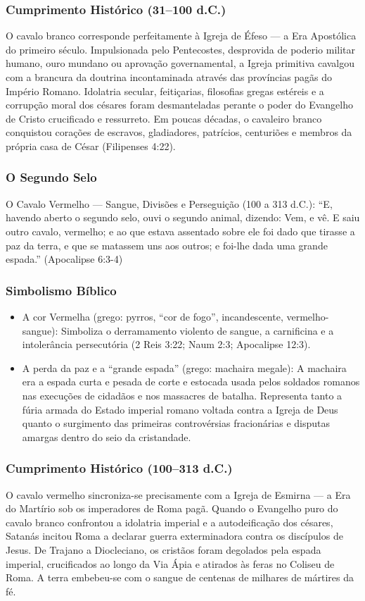 \documentclass[11pt,a4paper,openany]{book}
\begin{document}
\subsubsection*{Cumprimento Histórico (31–100 d.C.)}
O cavalo branco corresponde perfeitamente à Igreja de Éfeso — a Era Apostólica do primeiro século. Impulsionada pelo Pentecostes, desprovida de poderio militar humano, ouro mundano ou aprovação governamental, a Igreja primitiva cavalgou com a brancura da doutrina incontaminada através das províncias pagãs do Império Romano. Idolatria secular, feitiçarias, filosofias gregas estéreis e a corrupção moral dos césares foram desmanteladas perante o poder do Evangelho de Cristo crucificado e ressurreto. Em poucas décadas, o cavaleiro branco conquistou corações de escravos, gladiadores, patrícios, centuriões e membros da própria casa de César (Filipenses 4:22).


\subsubsection*{O Segundo Selo}
O Cavalo Vermelho — Sangue, Divisões e Perseguição (100 a 313 d.C.):
``E, havendo aberto o segundo selo, ouvi o segundo animal, dizendo: Vem, e vê. E saiu outro cavalo, vermelho; e ao que estava assentado sobre ele foi dado que tirasse a paz da terra, e que se matassem uns aos outros; e foi-lhe dada uma grande espada.'' (Apocalipse 6:3-4)


\subsubsection*{Simbolismo Bíblico}
\begin{itemize}
  \item A cor Vermelha (grego: pyrros, ``cor de fogo'', incandescente, vermelho-sangue): Simboliza o derramamento violento de sangue, a carnificina e a intolerância persecutória (2 Reis 3:22; Naum 2:3; Apocalipse 12:3).
  \item A perda da paz e a ``grande espada'' (grego: machaira megale): A machaira era a espada curta e pesada de corte e estocada usada pelos soldados romanos nas execuções de cidadãos e nos massacres de batalha. Representa tanto a fúria armada do Estado imperial romano voltada contra a Igreja de Deus quanto o surgimento das primeiras controvérsias fracionárias e disputas amargas dentro do seio da cristandade.
\end{itemize}



\subsubsection*{Cumprimento Histórico (100–313 d.C.)}
O cavalo vermelho sincroniza-se precisamente com a Igreja de Esmirna — a Era do Martírio sob os imperadores de Roma pagã. Quando o Evangelho puro do cavalo branco confrontou a idolatria imperial e a autodeificação dos césares, Satanás incitou Roma a declarar guerra exterminadora contra os discípulos de Jesus. De Trajano a Diocleciano, os cristãos foram degolados pela espada imperial, crucificados ao longo da Via Ápia e atirados às feras no Coliseu de Roma. A terra embebeu-se com o sangue de centenas de milhares de mártires da fé.
\end{document}
